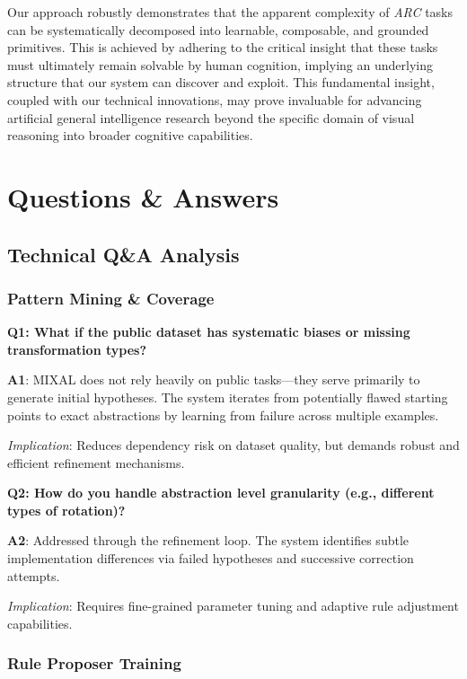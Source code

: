 \documentclass[12pt]{article}
\newcommand{\arc}{\textit{ARC}}
\begin{document}
Our approach robustly demonstrates that the apparent complexity of \arc{} tasks can be systematically decomposed into learnable, composable, and grounded primitives. This is achieved by adhering to the critical insight that these tasks must ultimately remain solvable by human cognition, implying an underlying structure that our system can discover and exploit. This fundamental insight, coupled with our technical innovations, may prove invaluable for advancing artificial general intelligence research beyond the specific domain of visual reasoning into broader cognitive capabilities.

\iffalse
\section{Questions \& Answers}

\subsection*{Technical Q\&A Analysis}

\subsubsection*{Pattern Mining \& Coverage}

\textbf{Q1: What if the public dataset has systematic biases or missing transformation types?}

\textbf{A1}: MIXAL does not rely heavily on public tasks—they serve primarily to generate initial hypotheses. The system iterates from potentially flawed starting points to exact abstractions by learning from failure across multiple examples.

\textit{Implication}: Reduces dependency risk on dataset quality, but demands robust and efficient refinement mechanisms.

\medskip

\textbf{Q2: How do you handle abstraction level granularity (e.g., different types of rotation)?}

\textbf{A2}: Addressed through the refinement loop. The system identifies subtle implementation differences via failed hypotheses and successive correction attempts.

\textit{Implication}: Requires fine-grained parameter tuning and adaptive rule adjustment capabilities.

\subsubsection*{Rule Proposer Training}
\end{document}
